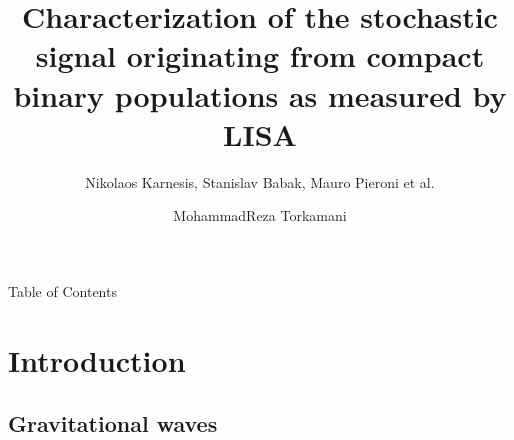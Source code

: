 \documentclass[pdf]{beamer}
\title[Stochastic signal originating from CBs measured by LISA]{Characterization of the stochastic signal originating from compact binary populations as measured by LISA}
\subtitle{Nikolaos Karnesis, Stanislav Babak, Mauro Pieroni et al.}
\author{MohammadReza Torkamani}
\begin{document}

\begin{frame}
    \titlepage
\end{frame}

\begin{frame}{Table of Contents}
\vspace*{.1cm}
  \tableofcontents
\end{frame}
\section{Introduction}
\subsection{Gravitational waves}
\end{document}
